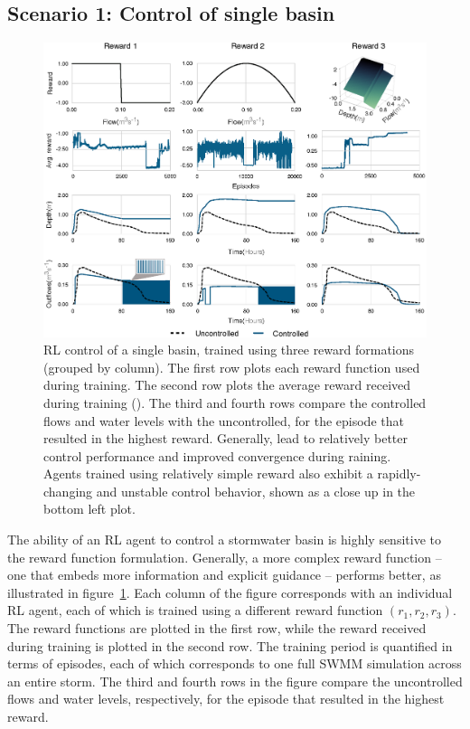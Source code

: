 \subsection{Scenario 1: Control of single basin}

\begin{figure}
    \centering
    \includegraphics[width=\textwidth]{gfx/Chapter-3/single_pond.eps}
    \caption{RL control of a single basin, trained using three reward formations (grouped by column). The first row plots each reward function used during training. The second row plots the average reward received during training (). The third and fourth rows compare the controlled flows and water levels with the uncontrolled, for the episode that resulted in the highest reward. Generally,   lead to relatively better control performance and improved convergence during raining. Agents trained using relatively simple reward also exhibit a rapidly-changing and unstable control behavior, shown as a close up in the bottom left plot.}
    \label{fig:3}
\end{figure}



The ability of an RL agent to control a stormwater basin is highly sensitive to the reward function formulation.
Generally, a more complex reward function -- one that embeds more information and explicit guidance -- performs better, as illustrated in figure~\ref{fig:3}.
Each column of the figure corresponds with an individual RL agent, each of which is trained using a different reward function $(r_1,r_2,r_3)$.
The reward functions are plotted in the first row, while the reward received during training is plotted in the second row.
The training period is quantified in terms of episodes, each of which corresponds to one full SWMM simulation across an entire storm.
The third and fourth rows in the figure compare the uncontrolled flows and water levels, respectively, for the episode that resulted in the highest reward.

